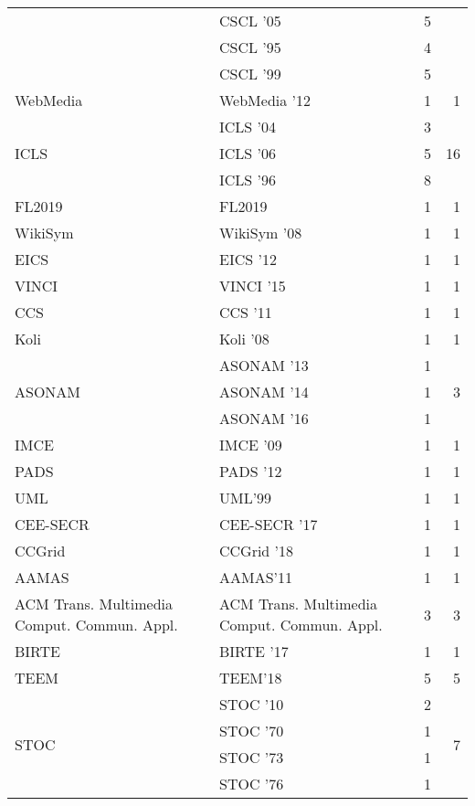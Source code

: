 \begin{table*}[t]
\begin{tabular}{llrr}
& CSCL '05 & 5 &\\
& CSCL '95 & 4 &\\
& CSCL '99 & 5 &\\
\multirow{1}{*}{WebMedia } & WebMedia '12 & 1 & \multirow{1}{*}{1}\\
\multirow{3}{*}{ICLS } & ICLS '04 & 3 & \multirow{3}{*}{16}\\
& ICLS '06 & 5 &\\
& ICLS '96 & 8 &\\
\multirow{1}{*}{FL2019} & FL2019 & 1 & \multirow{1}{*}{1}\\
\multirow{1}{*}{WikiSym } & WikiSym '08 & 1 & \multirow{1}{*}{1}\\
\multirow{1}{*}{EICS } & EICS '12 & 1 & \multirow{1}{*}{1}\\
\multirow{1}{*}{VINCI } & VINCI '15 & 1 & \multirow{1}{*}{1}\\
\multirow{1}{*}{CCS } & CCS '11 & 1 & \multirow{1}{*}{1}\\
\multirow{1}{*}{Koli } & Koli '08 & 1 & \multirow{1}{*}{1}\\
\multirow{3}{*}{ASONAM } & ASONAM '13 & 1 & \multirow{3}{*}{3}\\
& ASONAM '14 & 1 &\\
& ASONAM '16 & 1 &\\
\multirow{1}{*}{IMCE } & IMCE '09 & 1 & \multirow{1}{*}{1}\\
\multirow{1}{*}{PADS } & PADS '12 & 1 & \multirow{1}{*}{1}\\
\multirow{1}{*}{UML} & UML'99 & 1 & \multirow{1}{*}{1}\\
\multirow{1}{*}{CEE-SECR } & CEE-SECR '17 & 1 & \multirow{1}{*}{1}\\
\multirow{1}{*}{CCGrid } & CCGrid '18 & 1 & \multirow{1}{*}{1}\\
\multirow{1}{*}{AAMAS} & AAMAS'11 & 1 & \multirow{1}{*}{1}\\
\multirow{1}{*}{ACM Trans. Multimedia Comput. Commun. Appl.} & ACM Trans. Multimedia Comput. Commun. Appl. & 3 & \multirow{1}{*}{3}\\
\multirow{1}{*}{BIRTE } & BIRTE '17 & 1 & \multirow{1}{*}{1}\\
\multirow{1}{*}{TEEM} & TEEM'18 & 5 & \multirow{1}{*}{5}\\
\multirow{6}{*}{STOC } & STOC '10 & 2 & \multirow{6}{*}{7}\\
& STOC '70 & 1 &\\
& STOC '73 & 1 &\\
& STOC '76 & 1 &\\

\end{tabular}
\end{table*}

